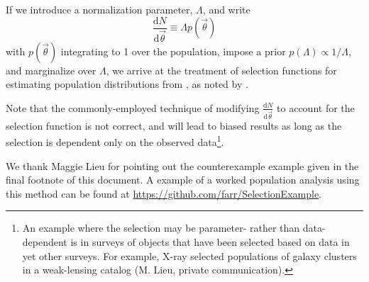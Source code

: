\documentclass[modern]{aastex62}
\newcommand{\dd}{\mathrm{d}}
\newcommand{\diff}[2]{\frac{\dd #1}{\dd #2}}
\newcommand{\vtheta}{\vec{\theta}}
\begin{document}
If we introduce a normalization parameter, $\Lambda$, and write
%
\begin{equation}
  \diff{N}{\vtheta} \equiv \Lambda p\left( \vtheta \right)
\end{equation}
%
with $p\left( \vtheta \right)$ integrating to 1 over the population, impose a
prior $p\left( \Lambda \right)\propto 1/\Lambda$, and marginalize over
$\Lambda$, we arrive at the treatment of selection functions for estimating
population distributions from \citet{Loredo2004,O1-BBH,Mandel2016}, as noted by
\citet{Fishbach2018}.

Note that the commonly-employed technique of modifying $\diff{N}{\vtheta}$ to
account for the selection function is not correct, and will lead to biased
results as long as the selection is dependent only on the observed
data\footnote{An example where the selection may be parameter- rather than
data-dependent is in surveys of objects that have been selected based on data in
yet other surveys.  For example, X-ray selected populations of galaxy clusters
in a weak-lensing catalog (M. Lieu, private communication).}.

\acknowledgments

We thank Maggie Lieu for pointing out the counterexample example given in the
final footnote of this document.  A example of a worked population analysis
using this method can be found at
\url{https://github.com/farr/SelectionExample}.


\end{document}
